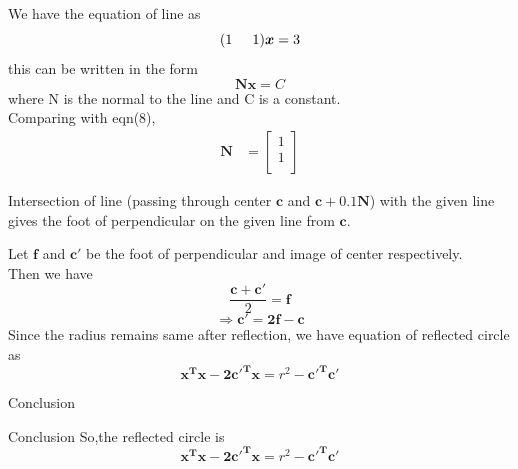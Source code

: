 \documentclass{beamer}
\begin{document}
\begin{frame}
\begin{solution}
We have the equation of line as
\begin{equation}
    (1\hspace{5mm} 1)\boldsymbol{x} = 3
\end{equation}
this can be written in the form
\begin{equation}
    \boldsymbol{Nx = } C
\end{equation}
where N is the normal to the line and C is a constant.\\
Comparing with eqn(8),\\
\begin{align}
    \boldsymbol{N} &= \begin{bmatrix}
           1 \\
           1 \\
         \end{bmatrix}
\end{align}

Intersection of line (passing through center $\boldsymbol{c}$ and $\boldsymbol{c + 0.1N}$) with the given line gives the foot of perpendicular on the given line from $\boldsymbol{c}$.\\
\end{solution}
\end{frame}

\begin{frame}
\begin{solution}
Let $\boldsymbol{f}$ and $\boldsymbol{c'}$ be the foot of perpendicular and image of center respectively.\\
Then we have 
\begin{equation}
    \frac{\boldsymbol{c+c'}}{2} = \boldsymbol{f}
\end{equation}
\begin{equation}
    \Rightarrow \boldsymbol{c' = 2f - c}
\end{equation}
Since the radius remains same after reflection, we have equation of reflected circle as 
\begin{equation}
    \boldsymbol{x^Tx - 2c'^Tx} = r^2 - \boldsymbol{c'^Tc'}
\end{equation}
\end{solution}
\end{frame}
\begin{frame}{Conclusion}
\begin{block}{Conclusion}
So,the reflected circle is\\
\begin{equation}
    \boldsymbol{x^Tx - 2c'^Tx} = r^2 - \boldsymbol{c'^Tc'}
\end{equation}
\end{block}
\end{frame}
\end{document}
